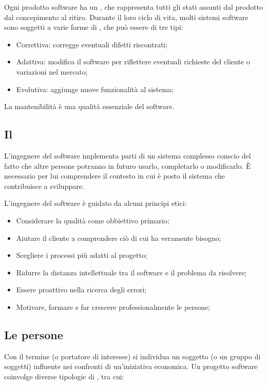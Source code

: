 Ogni prodotto software ha un , che rappresenta tutti gli stati assunti dal prodotto dal concepimento al ritiro. Durante il loro ciclo di vita, molti sistemi software sono soggetti a varie forme di , che può essere di tre tipi: 

\begin{itemize}
	\item Correttiva: corregge eventuali difetti riscontrati;
	\item Adattiva: modifica il software per riflettere eventuali richieste del cliente o variazioni nel mercato;
	\item Evolutiva: aggiunge nuove funzionalità al sistema;
\end{itemize}

La mantenibilità è una qualità essenziale del software.

\subsection{Il }
L'ingegnere del software implementa parti di un sistema complesso conscio del fatto che altre persone potranno in futuro usarlo, completarlo o modificarlo. È necessario per lui comprendere il contesto in cui è posto il sistema che contribuisce a sviluppare.

L'ingegnere del software è guidato da alcuni principi etici:
\begin{itemize}
	\item Considerare la qualità come obbiettivo primario;
	\item Aiutare il cliente a comprendere ciò di cui ha veramente bisogno;
	\item Scegliere i processi più adatti al progetto;
	\item Ridurre la distanza intellettuale tra il software e il problema da risolvere;
	\item Essere proattivo nella ricerca degli errori;
	\item Motivare, formare e far crescere professionalmente le persone;
\end{itemize}


\subsection{Le persone}
Con il termine  (o portatore di interesse) si individua un soggetto (o un gruppo di soggetti) influente nei confronti di un'iniziativa economica. Un progetto software coinvolge diverse tipologie di , tra cui:

